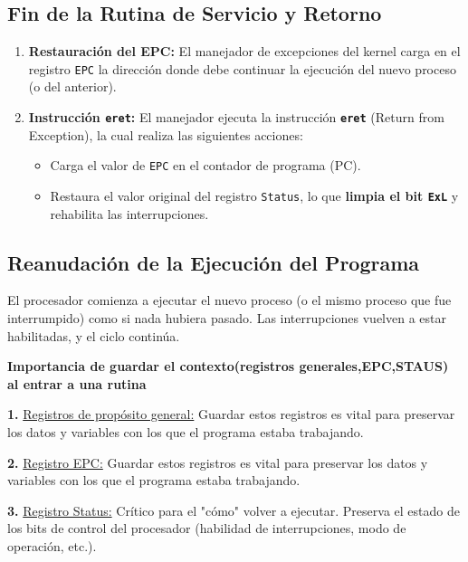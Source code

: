\documentclass{article}
\begin{document}
{{\subsection{ Fin de la Rutina de Servicio y Retorno}
\begin{enumerate}
    \item \textbf{Restauración del EPC:} El manejador de excepciones del kernel carga en el registro \texttt{EPC} la dirección donde debe continuar la ejecución del nuevo proceso (o del anterior).
    \item \textbf{Instrucción \texttt{eret}:} El manejador ejecuta la instrucción \textbf{\texttt{eret}} (Return from Exception), la cual realiza las siguientes acciones:
    \begin{itemize}
        \item Carga el valor de \texttt{EPC} en el contador de programa (PC).
        \item Restaura el valor original del registro \texttt{Status}, lo que \textbf{limpia el bit \texttt{ExL}} y rehabilita las interrupciones.
    \end{itemize}
\end{enumerate}

\subsection{ Reanudación de la Ejecución del Programa}
El procesador comienza a ejecutar el nuevo proceso (o el mismo proceso que fue interrumpido) como si nada hubiera pasado. Las interrupciones vuelven a estar habilitadas, y el ciclo continúa.

\quad
\newpage
\textbf{Importancia de guardar el contexto(registros generales,EPC,STAUS) al entrar a una rutina}

\quad

\textbf{1.   } \underline{Registros de propósito general:}  {Guardar estos registros es vital para preservar los datos y variables con los que el programa estaba trabajando.}
\quad

\textbf{2.   } \underline{Registro EPC:}  {Guardar estos registros es vital para preservar los datos y variables con los que el programa estaba trabajando.}
\quad

\textbf{3.   } \underline{Registro Status:}  {Crítico para el "cómo" volver a ejecutar. Preserva el estado de los bits de control del procesador (habilidad de interrupciones, modo de operación, etc.).}


\quad
\newpage







}}
\end{document}
